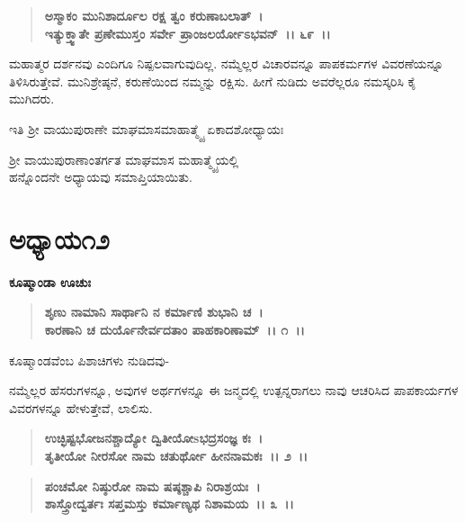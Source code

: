 \begin{verse}
\textbf{ಅಸ್ಮಾಕಂ ಮುನಿಶಾರ್ದೂಲ ರಕ್ಷ ತ್ವಂ ಕರುಣಾಬಲಾತ್~।}\\\textbf{ಇತ್ಯುಕ್ತ್ವಾತೇ ಪ್ರಣೇಮುಸ್ತಂ ಸರ್ವೇ ಪ್ರಾಂಜಲರ್ಯೋಽಭವನ್~।। ೬೯~।।}
\end{verse}

ಮಹಾತ್ಮರ ದರ್ಶನವು ಎಂದಿಗೂ ನಿಷ್ಪಲವಾಗುವುದಿಲ್ಲ. ನಮ್ಮೆಲ್ಲರ ವಿಚಾರವನ್ನೂ ಪಾಪಕರ್ಮಗಳ ವಿವರಣೆಯನ್ನೂ ತಿಳಿಸಿರುತ್ತೇವೆ. ಮುನಿಶ್ರೇಷ್ಠನೆ, ಕರುಣೆಯಿಂದ ನಮ್ಮನ್ನು ರಕ್ಷಿಸು. ಹೀಗೆ ನುಡಿದು ಅವರೆಲ್ಲರೂ ನಮಸ್ಕರಿಸಿ ಕೈ ಮುಗಿದರು.

\begin{center}
ಇತಿ ಶ‍್ರೀ ವಾಯುಪುರಾಣೇ ಮಾಘಮಾಸಮಾಹಾತ್ಮ್ಯೈ ಏಕಾದಶೋಧ್ಯಾಯಃ 
\end{center}

\begin{center}
ಶ‍್ರೀ ವಾಯುಪುರಾಣಾಂತರ್ಗತ ಮಾಘಮಾಸ ಮಹಾತ್ಮ್ಯೈಯಲ್ಲಿ \\ ಹನ್ನೊಂದನೇ ಅಧ್ಯಾಯವು ಸಮಾಪ್ತಿಯಾಯಿತು.
\end{center}

\newpage

\section*{ಅಧ್ಯಾಯ\enginline{-}೧೨}

\emptypage

\begin{flushleft}
\textbf{ಕೂಷ್ಮಾಂಡಾ ಊಚುಃ\enginline{-}}
\end{flushleft}

\begin{verse}
\textbf{ಶೃಣು ನಾಮಾನಿ ಸಾರ್ಥಾನಿ ನ ಕರ್ಮಾಣಿ ಶುಭಾನಿ ಚ~।}\\\textbf{ಕಾರಣಾನಿ ಚ ದುರ್ಯೊನೇರ್ವದತಾಂ ಪಾಹಕಾರಿಣಾಮ್~।। ೧~।। }
\end{verse}

\begin{flushleft}
ಕೂಷ್ಮಾಂಡವೆಂಬ ಪಿಶಾಚಿಗಳು ನುಡಿದವು-
\end{flushleft}

ನಮ್ಮೆಲ್ಲರ ಹೆಸರುಗಳನ್ನೂ, ಅವುಗಳ ಅರ್ಥಗಳನ್ನೂ ಈ ಜನ್ಮದಲ್ಲಿ ಉತ್ಪನ್ನರಾಗಲು ನಾವು ಆಚರಿಸಿದ ಪಾಪಕಾರ್ಯಗಳ ವಿವರಗಳನ್ನೂ ಹೇಳುತ್ತೇವೆ, ಲಾಲಿಸು.

\begin{verse}
\textbf{ಉಚ್ಛಿಷ್ಟಭೋಜನಶ್ಚಾದ್ಯೋ ದ್ವಿತೀಯೋsಭದ್ರಸಂಜ್ಞ ಕಃ~।}\\\textbf{ತೃತೀಯೋ ನೀರಸೋ ನಾಮ ಚತುರ್ಥೋ ಹೀನನಾಮಕಃ~।। ೨~।। }
\end{verse}

\begin{verse}
\textbf{ಪಂಚಮೋ ನಿಷ್ಠುರೋ ನಾಮ ಷಷ್ಠಶ್ಚಾಪಿ ನಿರಾಶ್ರಯಃ~।}\\\textbf{ಶಾಸ್ತ್ರೋದ್ವರ್ತಃ ಸಪ್ತಮಸ್ತು ಕರ್ಮಾಣ್ಯಥ ನಿಶಾಮಯ~।। ೩~।।}
\end{verse}

